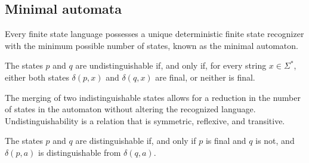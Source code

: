\subsection{Minimal automata}
\begin{property}
    Every finite state language possesses a unique deterministic finite state recognizer with the minimum possible number of states, known as the minimal automaton.
\end{property}   
\begin{definition}
    The states $p$ and $q$ are undistinguishable if, and only if, for every string $x \in \Sigma^{\ast}$, either both states $\delta(p,x)$ and $\delta(q,x)$ are final, or neither is final.
\end{definition}
The merging of two indistinguishable states allows for a reduction in the number of states in the automaton without altering the recognized language.
Undistinguishability is a relation that is symmetric, reflexive, and transitive.
\begin{definition}
    The states $p$ and $q$ are distinguishable if, and only if $p$ is final and $q$ is not, and $\delta(p,a)$ is distinguishable from $\delta(q,a)$.
\end{definition}
